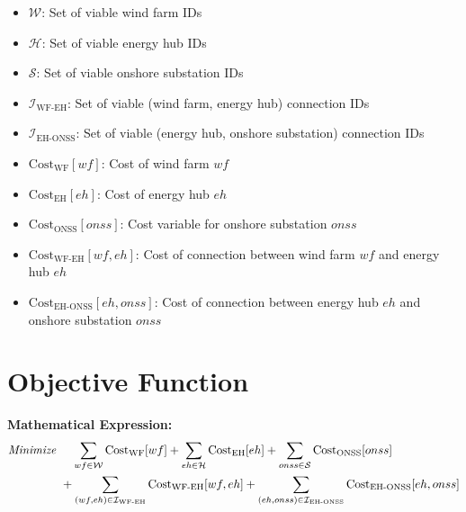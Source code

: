 \begin{itemize}
    \item \( \mathcal{W} \): Set of viable wind farm IDs
    \item \( \mathcal{H} \): Set of viable energy hub IDs
    \item \( \mathcal{S} \): Set of viable onshore substation IDs
    \item \( \mathcal{I}_{\text{WF-EH}} \): Set of viable (wind farm, energy hub) connection IDs
    \item \( \mathcal{I}_{\text{EH-ONSS}} \): Set of viable (energy hub, onshore substation) connection IDs
    \item \( \text{Cost}_{\text{WF}}[wf] \): Cost of wind farm \( wf \)
    \item \( \text{Cost}_{\text{EH}}[eh] \): Cost of energy hub \( eh \)
    \item \( \text{Cost}_{\text{ONSS}}[onss] \): Cost variable for onshore substation \( onss \)
    \item \( \text{Cost}_{\text{WF-EH}}[wf, eh] \): Cost of connection between wind farm \( wf \) and energy hub \( eh \)
    \item \( \text{Cost}_{\text{EH-ONSS}}[eh, onss] \): Cost of connection between energy hub \( eh \) and onshore substation \( onss \)
\end{itemize}

\section*{Objective Function}

\textbf{Mathematical Expression:}
\[
\begin{aligned}
\text{\emph{Minimize} } & 
\quad \sum_{wf \in \mathcal{W}} \text{Cost}_{\text{WF}}[wf] + 
\sum_{eh \in \mathcal{H}} \text{Cost}_{\text{EH}}[eh] + 
\sum_{onss \in \mathcal{S}} \text{Cost}_{\text{ONSS}}[onss] \\
& + \sum_{(wf, eh) \in \mathcal{I}_{\text{WF-EH}}} \text{Cost}_{\text{WF-EH}}[wf, eh] + 
\sum_{(eh, onss) \in \mathcal{I}_{\text{EH-ONSS}}} \text{Cost}_{\text{EH-ONSS}}[eh, onss]
\end{aligned}
\]

